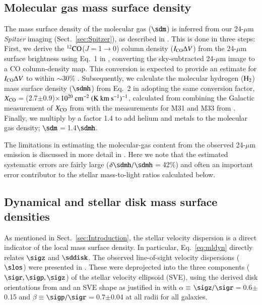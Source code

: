 \documentclass[traditabstract]{aa} %
\begin{document}
\subsection{Molecular gas mass surface density}
The mass surface density of the molecular gas ($\sdm$) is inferred from our 24-$\mu$m
{\it Spitzer} imaging (Sect.~\ref{sec:Spitzer}), as described in
. This is done in three steps: First, we derive the 
$^{12}{\rm CO}$($J$$=$1$\rightarrow$0) column density ($I_{\rm CO} \Delta V$) from the 
24-$\mu$m surface brightness using Eq.~1 in , converting the
sky-subtracted 24-$\mu$m image to a CO column-density map. This conversion is expected to
provide an estimate for $I_{\rm CO} \Delta V$ to within $\sim$30\% 
. Subsequently, we calculate the molecular hydrogen ($\rm H_2$)
mass surface density ($\sdmh$) from Eq.~2 in  adopting the same
conversion factor,
$X_{\rm CO}$$=$(2.7$\pm$0.9)$\times$$\rm10^{20}~cm^{-2}~(K~km~s^{-1})^{-1}$, calculated
from  combining the Galactic measurement of $X_{\rm CO}$ from \cite{dame2001} with the 
measurements for M31 and M33 from \cite{bolatto2008}. Finally, we multiply by a factor
1.4 to add helium and metals to the molecular gas density; $\sdm$$=$1.4$\sdmh$.

The limitations in estimating the molecular-gas content from the observed 24-$\mu$m 
emission is discussed in more detail in . Here we note that the 
estimated systematic errors are fairly large ($\delta\sdmh/\sdmh$$=$42\%) and often an 
important error contributor to the stellar mass-to-light ratios calculated below.


\subsection{Dynamical and stellar disk mass surface densities}
As mentioned in Sect.~\ref{sec:Introduction}, the stellar velocity dispersion is a direct
indicator of the local mass surface density. In particular, Eq.~\ref{eq:mldyn} directly
relates $\sigz$ and $\sddisk$. The observed line-of-sight velocity dispersions ($\slos$)
were presented in . These were deprojected into the three
components ($\sigr,\sigp, \sigz$) of the stellar velocity ellipsoid (SVE), using the 
derived disk orientations from  and an SVE shape as justified
in  with $\alpha$$\equiv$$\sigz/\sigr$$=$0.6$\pm$0.15 and 
$\beta$$\equiv$$\sigp/\sigr$$=$0.7$\pm$0.04 at all radii for all galaxies.
\end{document}
